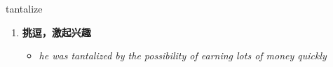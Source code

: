 
\begin{frame}
{\huge tantalize}
\begin{center}
\begin{enumerate}\Large
  \item \textbf{挑逗，激起兴趣}
  \begin{itemize}
    \item \em{\Large{he was tantalized by the possibility of earning lots of money quickly}}
  \end{itemize}
\end{enumerate}
\end{center}
\end{frame}
